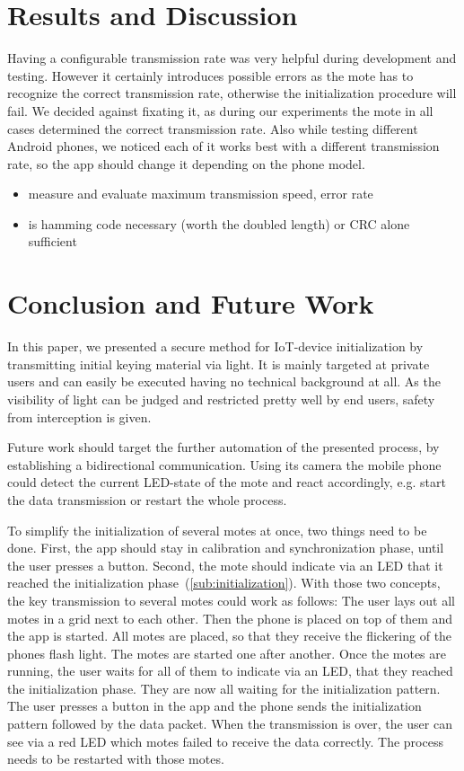 \documentclass{sig-alternate} %
\begin{document}
\section{Results and Discussion}
\label{sec:results_and_discussion}

Having a configurable transmission rate was very helpful during development and testing.
However it certainly introduces possible errors as the mote has to recognize the correct transmission rate, otherwise the initialization procedure will fail.
We decided against fixating it, as during our experiments the mote in all cases determined the correct transmission rate.
Also while testing different Android phones, we noticed each of it works best with a different transmission rate, so the app should change it depending on the phone model.

\begin{itemize}
	\item measure and evaluate maximum transmission speed, error rate
	\item is hamming code necessary (worth the doubled length) or CRC alone sufficient
\end{itemize}



\section{Conclusion and Future Work}
\label{sec:future_work}

In this paper, we presented a secure method for IoT-device initialization by transmitting initial keying material via light.
It is mainly targeted at private users and can easily be executed having no technical background at all.
As the visibility of light can be judged and restricted pretty well by end users, safety from interception is given.

Future work should target the further automation of the presented process, by establishing a bidirectional communication.
Using its camera the mobile phone could detect the current LED-state of the mote and react accordingly, e.g. start the data transmission or restart the whole process.

To simplify the initialization of several motes at once, two things need to be done.
First, the app should stay in calibration and synchronization phase, until the user presses a button.
Second, the mote should indicate via an LED that it reached the initialization phase~(\ref{sub:initialization}).
With those two concepts, the key transmission to several motes could work as follows:
The user lays out all motes in a grid next to each other.
Then the phone is placed on top of them and the app is started.
All motes are placed, so that they receive the flickering of the phones flash light.
The motes are started one after another.
Once the motes are running, the user waits for all of them to indicate via an LED, that they reached the initialization phase.
They are now all waiting for the initialization pattern.
The user presses a button in the app and the phone sends the initialization pattern followed by the data packet.
When the transmission is over, the user can see via a red LED which motes failed to receive the data correctly.
The process needs to be restarted with those motes.




\end{document}
